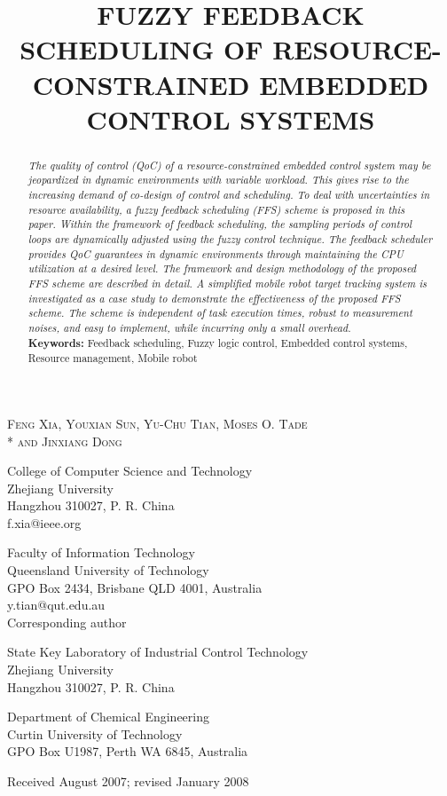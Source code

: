 \documentclass[12pt,a4paper]{ijicic}
\title{}
\title[FUZZY FEEDBACK SCHEDULING OF EMBEDDED CONTROL SYSTEMS]
      {FUZZY FEEDBACK SCHEDULING OF RESOURCE-CONSTRAINED EMBEDDED CONTROL SYSTEMS}
\author[F. Xia, Y. Sun, Y.-C. Tian, M. O. Tade and J. Dong]
\author[F. Xia, Y. Sun, Y.-C. Tian, M. O. Tade and J. Dong]{}
\begin{document}
\maketitle

\begin{center}
\normalsize{\scshape Feng Xia, Youxian Sun, Yu-Chu
Tian, Moses O. Tade \\* and Jinxiang Dong}
\footnotesize\rmfamily
\medskip

College of Computer Science and Technology\\
Zhejiang University\\
Hangzhou 310027, P. R. China\\
f.xia@ieee.org
\medskip

Faculty of Information Technology \\
Queensland University of Technology\\
GPO Box 2434, Brisbane QLD 4001, Australia\\
y.tian@qut.edu.au\\
Corresponding author
\medskip

State Key Laboratory of Industrial Control Technology\\
Zhejiang University\\
Hangzhou 310027, P. R. China
\medskip

Department of Chemical Engineering\\
Curtin University of Technology\\
GPO Box U1987, Perth WA 6845, Australia

\end{center}

\medskip
\centerline{\textsf{Received August 2007; revised January 2008}}
\medskip


\begin{abstract}
{\em The quality of control (QoC) of a resource-constrained embedded
control system may be jeopardized in dynamic environments with
variable workload. This gives rise to the increasing demand of
co-design of control and scheduling. To deal with uncertainties in
resource availability, a fuzzy feedback scheduling (FFS) scheme is
proposed in this paper. Within the framework of feedback scheduling,
the sampling periods of control loops are dynamically adjusted using
the fuzzy control technique. The feedback scheduler provides QoC
guarantees in dynamic environments through maintaining the CPU
utilization at a desired level. The framework and design methodology
of the proposed FFS scheme are described in detail. A simplified
mobile robot target tracking system is investigated as a case study
to demonstrate the effectiveness of the proposed FFS scheme. The
scheme is independent of task execution times, robust to measurement
noises, and easy to implement, while incurring only a small
overhead.}\\
{\bf Keywords:} Feedback scheduling, Fuzzy logic control, Embedded
control systems, Resource management, Mobile robot
\end{abstract}
\end{document}
